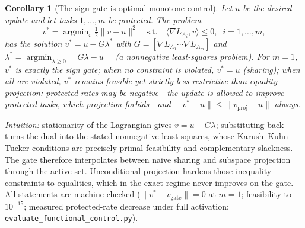 \documentclass[10pt,a4paper]{article}
\theoremstyle{plain}
\newtheorem{corollary}{Corollary}
\theoremstyle{definition}
\begin{document}
\begin{corollary}[The sign gate is optimal monotone control]
\label{cor:qpgate}
Let $u$ be the desired update and let tasks $1,\dots,m$ be protected. The problem
\begin{equation}
v^\ast=\operatorname{argmin}_v \tfrac12\|v-u\|^2
\quad\text{s.t.}\quad \langle\nabla L_{A_i},v\rangle\le 0,\;\; i=1,\dots,m,
\label{eq:qpgate}
\end{equation}
has the solution $v^\ast=u-G\lambda^\ast$ with $G=[\nabla L_{A_1}\cdots\nabla L_{A_m}]$
and $\lambda^\ast=\operatorname{argmin}_{\lambda\ge0}\|G\lambda-u\|$ (a nonnegative
least-squares problem). For $m=1$, $v^\ast$ is exactly the sign gate; when no constraint
is violated, $v^\ast=u$ (sharing); when all are violated, $v^\ast$ remains feasible yet
strictly less restrictive than equality projection: protected rates may be negative---the
update is allowed to \emph{improve} protected tasks, which projection forbids---and
$\|v^\ast-u\|\le\|v_{\mathrm{proj}}-u\|$ always.
\end{corollary}
\noindent\emph{Intuition:} stationarity of the Lagrangian gives $v=u-G\lambda$;
substituting back turns the dual into the stated nonnegative least squares, whose
Karush--Kuhn--Tucker conditions are precisely primal feasibility and complementary
slackness. The gate therefore interpolates between naive sharing and subspace projection
through the active set. Unconditional projection hardens those inequality constraints to
equalities, which in the exact regime never improves on the gate. All
statements are machine-checked ($\|v^\ast-v_{\mathrm{gate}}\|=0$ at $m=1$; feasibility to
$10^{-15}$; measured protected-rate decrease under full activation;
\texttt{evaluate\_functional\_control.py}).
\end{document}
